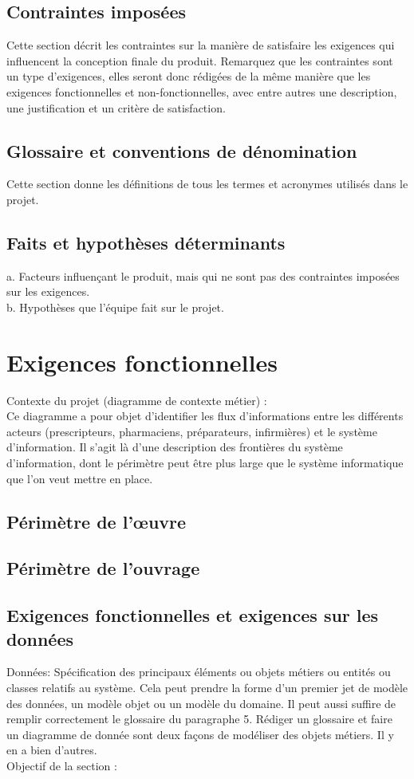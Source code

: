 		\subsection{Contraintes imposées}
		Cette section décrit les contraintes sur la manière de satisfaire les exigences qui influencent la conception finale du produit. Remarquez que les contraintes sont un type d’exigences, elles seront donc rédigées de la même manière que les exigences fonctionnelles et non-fonctionnelles, avec entre autres une description, une justification et un critère de satisfaction.
		
		\subsection{Glossaire et conventions de dénomination}
		Cette section donne les définitions de tous les termes et acronymes utilisés dans le projet.
		
		\subsection{Faits et hypothèses déterminants}
		a. Facteurs influençant le produit, mais qui ne sont pas des contraintes imposées sur les exigences.\\
		b. Hypothèses que l’équipe fait sur le projet.
		
	\section{Exigences fonctionnelles}
		Contexte du projet (diagramme de contexte métier) :\\	 
		Ce diagramme a pour objet d’identifier les flux d’informations entre les différents acteurs (prescripteurs, pharmaciens, préparateurs, infirmières) et le système d’information.
		Il s’agit là d’une description des frontières du système d’information, dont le périmètre peut être plus large que le système informatique que l’on veut mettre en place.

		\subsection{Périmètre de l'œuvre}
		
		\subsection{Périmètre de l'ouvrage}

		\subsection{Exigences fonctionnelles et exigences sur les données}		
		Données: Spécification des principaux éléments ou objets métiers ou entités ou classes relatifs au système. Cela peut prendre la forme d’un premier jet de modèle des données, un modèle objet ou un modèle du domaine. Il peut aussi suffire de remplir correctement le glossaire du paragraphe 5. Rédiger un glossaire et faire un diagramme de donnée sont deux façons de modéliser des objets métiers. Il y en a bien d’autres.\\
		Objectif de la section :
	
